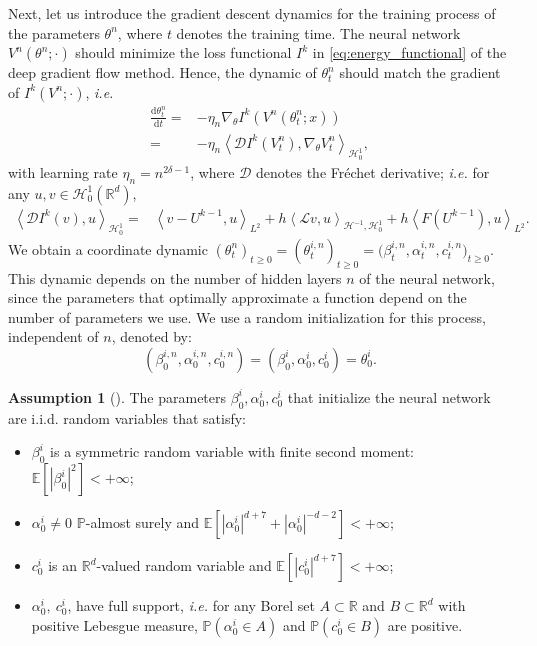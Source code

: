 \documentclass[11pt,a4paper,reqno]{amsart}
\numberwithin{equation}{section}
\theoremstyle{plain}
\theoremstyle{definition}
\newtheorem{assumption}{Assumption}
\newenvironment{namedassumption}[2][]
  {\renewcommand\theassumption{#2}\begin{assumption}[#1]}
  {\end{assumption}}
\def\ud{\mathrm d}
\newcommand{\ip}[1]{\left\langle#1\right\rangle}
\newcommand{\p}{\mathbb{P}}
\newcommand{\E}{\mathbb{E}}
\newcommand{\cL}{\mathcal{L}}
\newcommand{\cH}{\mathcal{H}}
\newcommand{\R}{\mathbb{R}}
\newcommand{\D}{\mathcal{D}}
\newcommand{\abs}[1]{\left|#1\right|} %
\begin{document}
Next, let us introduce the gradient descent dynamics for the training process of the parameters $\theta^n$, where $t$ denotes the training time. 
The neural network $V^n(\theta^n;\cdot)$ should minimize the loss functional $I^k$ in \eqref{eq:energy_functional} of the deep gradient flow method. 
Hence, the dynamic of $\theta_t^n$ should match the gradient of $I^k ( V^n ; \cdot )$, \emph{i.e.}
\begin{align}
\label{eq:dytheta}
 \frac{\ud \theta_t^n}{\ud t} = & - \eta_n \nabla_\theta I^k \left( V^n \left( \theta_t^n; x \right) \right) \nonumber \\ 
 = & - \eta_n\ip{\D I^k \left( V_t^n \right), \nabla_\theta V_t^n}_{\cH_0^1}, 
 \end{align}
with learning rate $\eta_n = n^{2\delta - 1}$, where $\D$ denotes the Fr\'echet derivative; \emph{i.e.} for any $u, v \in \cH_0^1 (\R^d)$,
\begin{align}
\label{eq:frechet-loss}
 \ip{\D I^k \left( v \right), u}_{\cH_0^1} = & \ip{v-U^{k-1},u}_{L^2} + h \ip{\cL v,u}_{\cH^{-1},\cH_0^1} + h \ip{F \left( U^{k - 1} \right),u}_{L^2}.
\end{align}
We obtain a coordinate dynamic ${(\theta^{n}_t)_{t\ge0}}=(\theta_t^{i, n})_{t\ge0} = \big( \beta_t^{i, n}, \alpha_t^{i, n}, c_t^{i, n}\big)_{t\ge0}$. 
This dynamic depends on the number of hidden layers $n$ of the neural network, since the parameters that optimally approximate a function depend on the number of parameters we use. 
We use a random initialization for this process, independent of $n$, denoted by:
\[
\left( \beta_0^{i, n}, \alpha_0^{i, n}, c_0^{i, n} \right) = \left( \beta_0^i, \alpha_0^i, c_0^i \right) = \theta^i_0.
\]

\begin{namedassumption}{(NNI)} %
\label{ass:initial}
The parameters $\beta_0^i, \alpha_0^i, c_0^i$ that initialize the neural network are i.i.d. random variables that satisfy:
\begin{itemize}
    \item[(i)] $\beta_0^i$ is a symmetric random variable with finite second moment: $\E \left[ \abs{\beta_0^i}^2 \right] < + \infty$;
    \item[(ii)] $\alpha_0^i \ne 0$ $\p$-almost surely and $\E \left[ \abs{\alpha_0^i}^{d+7} + \abs{\alpha_0^i}^{-d-2} \right] < + \infty$;
    \item[(iii)] $c_0^i$ is an $\R^d$-valued random variable and $\E \left[ \abs{c_0^i}^{d+7} \right] < + \infty$;
    \item[(iv)] $\alpha_0^i,\  c_0^i$, have full support, \emph{i.e.} for any Borel set $A\subset \R$ and $B\subset \R^d$ with positive Lebesgue measure, $\p\left(\alpha_0^i\in A\right)$ and $\p\left(c_0^i\in  B\right)$ are positive. 
\end{itemize}
\end{namedassumption}
\end{document}
